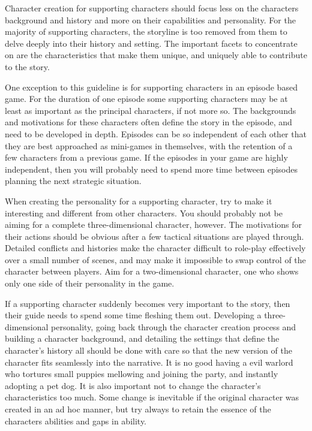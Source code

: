 \documentclass[twoside]{book}
\begin{document}
Character creation for supporting characters should focus less on the
characters background and history and more on their capabilities and
personality. For the majority of supporting characters, the storyline
is too removed from them to delve deeply into their history and
setting. The important facets to concentrate on are the
characteristics that make them unique, and uniquely able to contribute
to the story.

One exception to this guideline is for supporting characters in an
episode based game. For the duration of one episode some supporting
characters may be at least as important as the principal characters,
if not more so. The backgrounds and motivations for these characters
often define the story in the episode, and need to be developed in
depth. Episodes can be so independent of each other that they are best
approached as mini-games in themselves, with the retention of a few
characters from a previous game. If the episodes in your game are
highly independent, then you will probably need to spend more time
between episodes planning the next strategic situation.

When creating the personality for a supporting character, try to make
it interesting and different from other characters. You should
probably not be aiming for a complete three-dimensional character,
however. The motivations for their actions should be obvious after a
few tactical situations are played through. Detailed conflicts and
histories make the character difficult to role-play effectively over a
small number of scenes, and may make it impossible to swap control of
the character between players. Aim for a two-dimensional character,
one who shows only one side of their personality in the game.

If a supporting character suddenly becomes very important to the
story, then their guide needs to spend some time fleshing them
out. Developing a three-dimensional personality, going back through
the character creation process and building a character background,
and detailing the settings that define the character's history all
should be done with care so that the new version of the character fits
seamlessly into the narrative. It is no good having a evil warlord who
tortures small puppies mellowing and joining the party, and instantly
adopting a pet dog. It is also important not to change the character's
characteristics too much. Some change is inevitable if the original
character was created in an ad hoc manner, but try always to retain
the essence of the characters abilities and gaps in ability.
\end{document}
